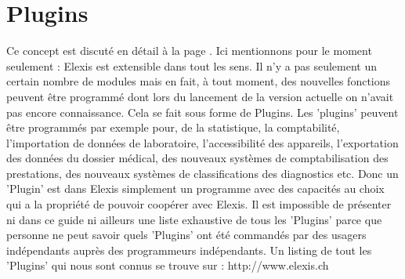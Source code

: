 \section{Plugins}
Ce concept est discuté en détail à la page \pageref{expl:plugins}. Ici mentionnons pour le moment seulement : Elexis est extensible dans tout les sens. Il n'y a pas seulement un certain nombre de \glqq modules\grqq{} mais en fait, à tout moment, des nouvelles fonctions peuvent être programmé dont lors du lancement de la version actuelle on n'avait pas encore connaissance. Cela se fait sous forme de \glqq Plugins\grqq{}. Les 'plugins' peuvent être programmés par exemple pour, de la statistique, la comptabilité, l'importation de données de laboratoire, l'accessibilité des
appareils, l'exportation des données du dossier médical, des nouveaux systèmes de comptabilisation des prestations, des nouveaux systèmes de classifications des diagnostics etc.
Donc un 'Plugin' est dans Elexis simplement un programme avec des capacités au choix qui a la propriété de pouvoir coopérer avec Elexis.
Il est impossible de présenter ni dans ce guide ni ailleurs une liste exhaustive de tous les 'Plugins' parce que personne ne peut savoir quels 'Plugins' ont été commandés par des usagers indépendants auprès des programmeurs indépendants.
Un listing de tout les 'Plugins' qui nous sont connus se trouve sur : http://www.elexis.ch



